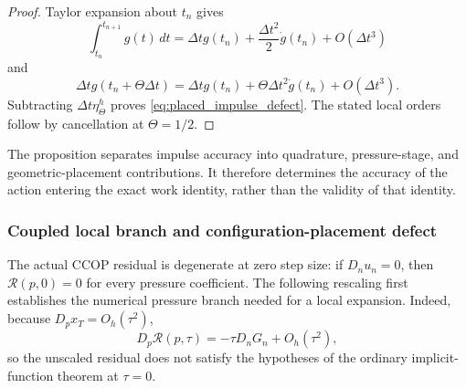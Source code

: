 \documentclass[11pt]{article}
\theoremstyle{plain}
\theoremstyle{definition}
\theoremstyle{remark}
\newcommand{\dt}{\Delta t}
\newcommand{\Th}{\Theta}
\begin{document}
\begin{proof}
Taylor expansion about $t_n$ gives
\[
 \int_{t_n}^{t_{n+1}}g(t)\,dt
 =\dt g(t_n)+\frac{\dt^2}{2}\dot g(t_n)+O(\dt^3)
\]
and
\[
 \dt g(t_n+\Th\dt)
 =\dt g(t_n)+\Th\dt^2\dot g(t_n)+O(\dt^3).
\]
Subtracting $\dt\eta_\Th^h$ proves
\eqref{eq:placed_impulse_defect}.  The stated local orders follow by
cancellation at $\Th=1/2$.
\end{proof}

The proposition separates impulse accuracy into quadrature, pressure-stage,
and geometric-placement contributions.  It therefore determines the accuracy
of the action entering the exact work identity, rather than the validity of
that identity.

\subsubsection{Coupled local branch and configuration-placement defect}

The actual CCOP residual is degenerate at zero step size: if $D_nu_n=0$, then
$\mathcal R(p,0)=0$ for every pressure coefficient.  The following rescaling
first establishes the numerical pressure branch needed for a local expansion.
Indeed, because $D_px_T=O_h(\tau^2)$,
\begin{equation}
 D_p\mathcal R(p,\tau)=-\tau D_nG_n+O_h(\tau^2),
 \label{eq:degenerate_pressure_jacobian}
\end{equation}
so the unscaled residual does not satisfy the hypotheses of the ordinary
implicit-function theorem at $\tau=0$.
\end{document}
